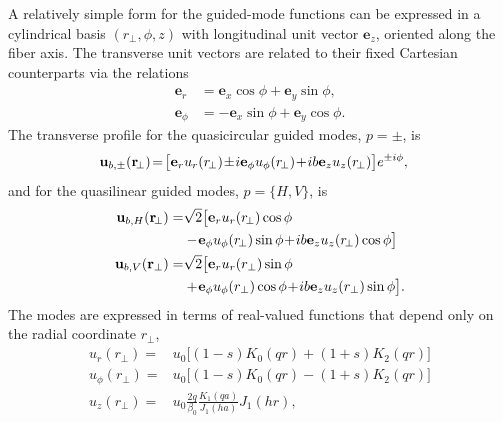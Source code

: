 \documentclass[aps,pra,twocolumn]{revtex4-1} %
\begin{document}
\begin{appendix}
A relatively simple form for the guided-mode functions can be expressed in a cylindrical basis $(r_\perp, \phi, z)$ with longitudinal unit vector $\mathbf{e}_z$, oriented along the fiber axis.  
The transverse unit vectors are related to their fixed Cartesian counterparts via the relations
\begin{subequations}
	\begin{align}
		\mathbf{e}_r     &= \mathbf{e}_x \cos \phi + \mathbf{e}_y \sin \phi, \\
		\mathbf{e}_\phi &= - \mathbf{e}_x \sin \phi + \mathbf{e}_y \cos \phi.
	\end{align}
\end{subequations}
The transverse profile for the quasicircular guided modes, $p = \pm$, is
	\begin{align} \label{Eq::QuasicircularModes}
		\!\!\!\!\!\mbf{u}_{b,\pm}(\mathbf{r}\!_\perp) \!=\! \big[\mathbf{e}_r u_r(r\!_\perp) \!\pm\! i \mathbf{e}_\phi u_\phi(r\!_\perp) \!+\!  i b \mathbf{e}_z  u_z(r\!_\perp) \big]e^{ \pm i \phi}, 
	\end{align}
and for the quasilinear guided modes, $p = \{H,V\}$, is
	\begin{subequations} \label{Eq::QuasilinearModes}
	\begin{align}
		\mbf{u}_{b,H}(\mathbf{r}\!_\perp) = & \sqrt{2} \big[ \mathbf{e}_r u_r(r\!_\perp) \cos \phi \nn\\
		&-\! \mathbf{e}_\phi u_\phi(r\!_\perp) \sin \phi \!+\!  ib \mathbf{e}_z  u_z(r\!_\perp) \cos \phi \big] \\
		\mbf{u}_{b,V}(\mathbf{r}_\perp) = & \sqrt{2} \big[ \mathbf{e}_r u_r(r_\perp) \sin \phi \nn\\
		&+\! \mathbf{e}_\phi u_\phi(r_\perp) \cos \phi \!+\!  ib \mathbf{e}_z  u_z(r_\perp) \sin \phi \big]. 
	\end{align}
	\end{subequations}
The modes are expressed in terms of real-valued functions that depend only on the radial coordinate $r_\perp$,
	\begin{subequations} \label{Eq::ProfileFunctions}
	\begin{align} 
		u_r(r_\perp) =& u_0 \big[ (1-s) K_0(qr) + (1+s)K_2(qr)\big] \\
		u_\phi(r_\perp) =& u_0\big[ (1-s) K_0(qr) - (1+s)K_2(qr)\big] \\
		u_z(r_\perp) =& u_0 \frac{2 q}{\beta_0} \frac{K_1(qa)}{J_1(ha)} J_1(hr), \label{Eq::zprofile}
	\end{align}
	\end{subequations}

\end{appendix}
\end{document}
